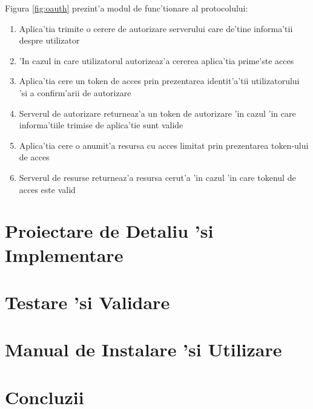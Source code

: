 \documentclass[12pt,a4paper,twoside]{report}
\begin{document}
Figura \ref{fig:oauth} prezint'a modul de func'tionare al protocolului:
\begin{enumerate}
    \item Aplica'tia trimite o cerere de autorizare serverului care de'tine informa'tii despre utilizator
    \item 'In cazul in care utilizatorul autorizeaz'a cererea aplica'tia prime'ste acces
    \item Aplica'tia cere un token de acces prin prezentarea identit'a'tii utilizatorului 'si a confirm'arii de autorizare
    \item Serverul de autorizare returneaz'a un token de autorizare 'in cazul 'in care informa'tiile trimise de aplica'tie sunt valide
    \item Aplica'tia cere o anumit'a resursa cu acces limitat prin prezentarea token-ului de acces
    \item Serverul de resurse returneaz'a resursa cerut'a 'in cazul 'in care tokenul de acces este valid
    \end{enumerate}




\chapter{Proiectare de Detaliu 'si Implementare}




\chapter{Testare 'si Validare}


\chapter{Manual de Instalare 'si Utilizare}

\chapter{Concluzii}



 

%
\end{document}
